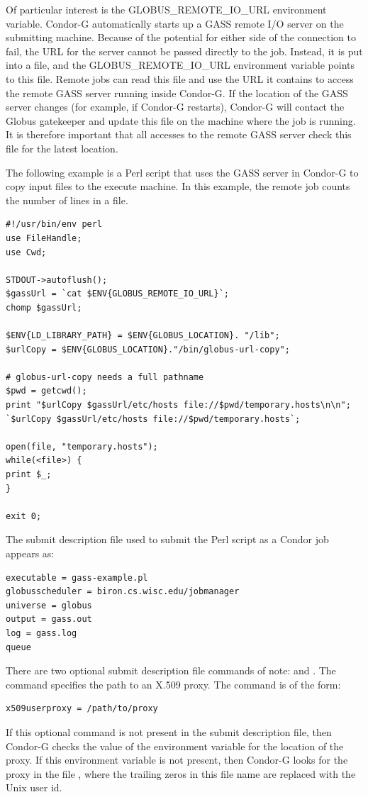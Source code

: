 Of particular interest is the GLOBUS\_REMOTE\_IO\_URL environment variable.
Condor-G automatically starts up a GASS remote I/O
server on the submitting machine.
Because of the potential for either side of the connection to fail,
the URL for the server cannot be passed directly to the job.
Instead, it is put into a file, and the GLOBUS\_REMOTE\_IO\_URL
environment variable points to this file. 
Remote jobs can read this file and use the URL it contains
to access the remote GASS server running inside Condor-G.
If the location
of the GASS server changes (for example, if Condor-G restarts),
Condor-G will contact the Globus gatekeeper and update this file on
the machine where the job is running.
It is therefore important that all accesses to
the remote GASS server check this file for the latest location.

The following example is a Perl script that uses the GASS server in Condor-G
to copy input files to the execute machine.
In this example, the remote job
counts the number of lines in a file.

\footnotesize
\begin{verbatim}
#!/usr/bin/env perl
use FileHandle;
use Cwd;

STDOUT->autoflush();
$gassUrl = `cat $ENV{GLOBUS_REMOTE_IO_URL}`;
chomp $gassUrl;

$ENV{LD_LIBRARY_PATH} = $ENV{GLOBUS_LOCATION}. "/lib";
$urlCopy = $ENV{GLOBUS_LOCATION}."/bin/globus-url-copy";

# globus-url-copy needs a full pathname
$pwd = getcwd();
print "$urlCopy $gassUrl/etc/hosts file://$pwd/temporary.hosts\n\n";
`$urlCopy $gassUrl/etc/hosts file://$pwd/temporary.hosts`;

open(file, "temporary.hosts");
while(<file>) {
print $_;
}

exit 0;
\end{verbatim}
\normalsize

The submit description file used to submit the Perl script as
a Condor job appears as:

\footnotesize
\begin{verbatim}
executable = gass-example.pl
globusscheduler = biron.cs.wisc.edu/jobmanager
universe = globus
output = gass.out
log = gass.log
queue
\end{verbatim}
\normalsize

There are two optional submit description file commands
of note:
 and
.
The  command specifies the path to
an X.509 proxy.
The command is of the form:
\begin{verbatim}
x509userproxy = /path/to/proxy
\end{verbatim}
If this optional command is not present in the submit description file,
then Condor-G checks the value of the environment variable
 for the location of the proxy.
If this environment variable is not present, then Condor-G
looks for the proxy in the file
,
where the trailing zeros in this file name are
replaced with the Unix user id.

